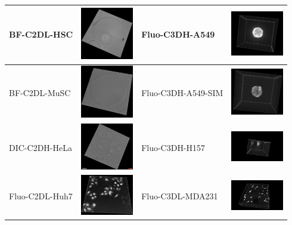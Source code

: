 \documentclass[./dissertation.tex]{subfiles}
\begin{document}
\begin{table}[!ht]
\begin{tabular}{|l|c|l|c|}
    BF-C2DL-HSC              & \includegraphics[width=2.3cm]{figures/ctc/BF-C2DL-HSC.png}     & Fluo-C3DH-A549           & \includegraphics[width=2.3cm]{figures/ctc/Fluo-C3DH-A549.png}     \\ \hline
    BF-C2DL-MuSC             & \includegraphics[width=2.3cm]{figures/ctc/BF-C2DL-MuSC.png}    & Fluo-C3DH-A549-SIM       & \includegraphics[width=2.3cm]{figures/ctc/Fluo-C3DH-A549-SIM.png} \\ \hline
    DIC-C2DH-HeLa            & \includegraphics[width=2.3cm]{figures/ctc/DIC-C2DH-HeLa.png}   & Fluo-C3DH-H157           & \includegraphics[width=2.3cm]{figures/ctc/Fluo-C3DH-H157.png}     \\ \hline
    Fluo-C2DL-Huh7           & \includegraphics[width=2.3cm]{figures/ctc/Fluo-C2DL-Huh7.png}  & Fluo-C3DL-MDA231         & \includegraphics[width=2.3cm]{figures/ctc/Fluo-C3DL-MDA231.png}   \\ \hline

\end{tabular}
\end{table}
\end{document}
